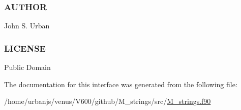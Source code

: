 \subsubsection*{A\+U\+T\+H\+OR}

John S. Urban \subsubsection*{L\+I\+C\+E\+N\+SE}

Public Domain 

The documentation for this interface was generated from the following file\+:\begin{DoxyCompactItemize}
\item 
/home/urbanjs/venus/\+V600/github/\+M\+\_\+strings/src/\mbox{\hyperlink{M__strings_8f90}{M\+\_\+strings.\+f90}}\end{DoxyCompactItemize}
